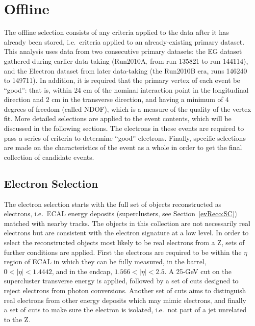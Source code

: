 \clearpage
\section{Offline}
\label{evSel:offline}
The offline selection consists of any criteria applied to the data 
after it has already been stored, 
i.e.\ criteria applied to an already-existing primary dataset.  
This analysis uses data from two consecutive primary datasets: 
the EG dataset gathered during earlier data-taking 
(Run2010A, from run 135821 to run 144114), 
and the Electron dataset from later data-taking 
(the Run2010B era, runs 146240 to 149711).  
In addition, it 
is 
required that the primary vertex of 
each event be ``good'': 
that is, within 24 cm of the nominal interaction point 
in the longitudinal direction
and 2 cm in the transverse direction, 
and having a minimum of 4 degrees of freedom (called NDOF),
which is a measure of the quality of the vertex fit.  %
More detailed selections 
are applied to 
the event contents, 
which will be discussed in the following sections.  
The electrons in these events 
are 
required to pass 
a series of criteria to determine ``good'' electrons.  
Finally, specific selections 
are 
made on the 
characteristics of the event as a whole 
in order to get the final collection of \Zee candidate 
events.  

\subsection{Electron Selection}
\label{evSel:elec}
The electron selection starts with the full set of objects reconstructed as electrons, 
i.e.\ ECAL energy deposits (superclusters, see Section~\ref{evReco:SC}) matched with nearby tracks.  
The objects in this collection are not necessarily real electrons 
but are consistent with the electron signature at a low level.  
In order to select the reconstructed objects most likely to be real electrons from a Z, 
sets of further conditions are applied.  
First the electrons are required to be within the $\eta$ region of ECAL in which 
they can be fully measured, in the barrel, $0 < |\eta| < 1.4442$, 
and in the endcap, $1.566 < |\eta| < 2.5$.  
A 25-GeV cut on the supercluster transverse energy is applied,
followed by a set of cuts designed to reject electrons from photon conversions.  
Another set of cuts aims to distinguish real electrons from other energy deposits which may mimic electrons, 
and finally a set of cuts to make sure the electron is isolated, 
i.e.\ not part of a jet unrelated to the Z.  

